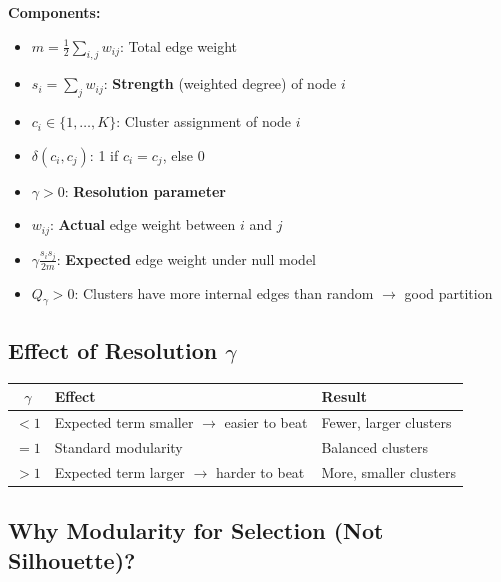 \documentclass[11pt,a4paper]{article}
\begin{document}
\textbf{Components:}
\begin{itemize}
    \item $m = \frac{1}{2}\sum_{i,j} w_{ij}$: Total edge weight
    \item $s_i = \sum_j w_{ij}$: \textbf{Strength} (weighted degree) of node $i$
    \item $c_i \in \{1, \ldots, K\}$: Cluster assignment of node $i$
    \item $\delta(c_i, c_j)$: 1 if $c_i = c_j$, else 0
    \item $\gamma > 0$: \textbf{Resolution parameter}
\end{itemize}

\begin{tcolorbox}[colback=blue!5,colframe=blue!40!black,title=Intuition: Modularity]
\begin{itemize}
    \item $w_{ij}$: \textbf{Actual} edge weight between $i$ and $j$
    \item $\gamma \frac{s_i s_j}{2m}$: \textbf{Expected} edge weight under null model
    \item $Q_\gamma > 0$: Clusters have more internal edges than random $\rightarrow$ good partition
\end{itemize}
\end{tcolorbox}

\subsection{Effect of Resolution $\gamma$}

\begin{table}[h]
\centering
\begin{tabular}{@{}cll@{}}
\toprule
$\gamma$ & \textbf{Effect} & \textbf{Result} \\
\midrule
$< 1$ & Expected term smaller $\rightarrow$ easier to beat & Fewer, larger clusters \\
$= 1$ & Standard modularity & Balanced clusters \\
$> 1$ & Expected term larger $\rightarrow$ harder to beat & More, smaller clusters \\
\bottomrule
\end{tabular}
\end{table}

\subsection{Why Modularity for Selection (Not Silhouette)?}
\end{document}

